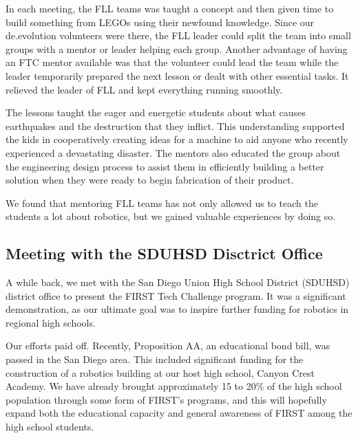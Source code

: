 In each meeting, the FLL teams was taught a concept and then given time to build something from LEGOs using their newfound knowledge. Since our de.evolution volunteers were there, the FLL leader could split the team into small groups with a mentor or leader helping each group. Another advantage of having an FTC mentor available was that the volunteer could lead the team while the leader temporarily prepared the next lesson or dealt with other essential tasks. It relieved the leader of FLL and kept everything running smoothly.

The lessons taught the eager and energetic students about what causes earthquakes and the destruction that they inflict. This understanding supported the kids in cooperatively creating ideas for a machine to aid anyone who recently experienced a devastating disaster. The mentors also educated the group about the engineering design process to assist them in efficiently building a better solution when they were ready to begin fabrication of their product.

We found that mentoring FLL teams has not only allowed us to teach the students a lot about robotics, but we gained valuable experiences by doing so.


\subsection{Meeting with the SDUHSD Disctrict Office}

A while back, we met with the San Diego Union High School District (SDUHSD) district office to present the FIRST Tech Challenge program. It was a significant demonstration, as our ultimate goal was to inspire further funding for robotics in regional high schools.

Our efforts paid off. Recently, Proposition AA, an educational bond bill, was passed in the San Diego area. This included significant funding for the construction of a robotics building at our host high school, Canyon Crest Academy. We have already brought approximately 15 to 20\% of the high school population through some form of FIRST's programs, and this will hopefully expand both the educational capacity and general awareness of FIRST among the high school students.